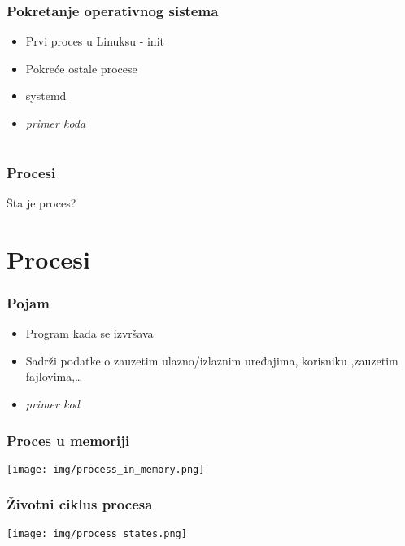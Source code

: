 \documentclass{beamer}
\begin{document}
\begin{frame}
    \frametitle{Pokretanje operativnog sistema}
    \begin{itemize}
        \item Prvi proces u Linuksu - init \newline
        \item Pokreće ostale procese \newline
        \item systemd \newline
        \item \textit{primer koda}
    \end{itemize}
\end{frame}

\section*{}
\begin{frame}
    \frametitle{Procesi}
    \begin{center}
        \large{Šta je proces?}
    \end{center}
\end{frame}

\section*{Procesi}
\begin{frame}
    \frametitle{Pojam}
    \begin{itemize}
        \item Program kada se izvršava \newline
        \item Sadrži podatke o zauzetim ulazno/izlaznim uređajima, korisniku ,zauzetim fajlovima,\dots \newline
        \item \textit{primer kod}
    \end{itemize}
\end{frame}

\begin{frame}
    \frametitle{Proces u memoriji}
    \begin{center}
        \texttt{[image: img/process\_in\_memory.png]}
    \end{center}
\end{frame}

\begin{frame}
    \frametitle{Životni ciklus procesa}
    \begin{center}
        \texttt{[image: img/process\_states.png]}
    \end{center}
\end{frame}
\end{document}
